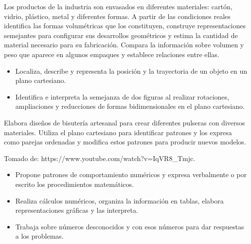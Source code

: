 \ejemplo

Los productos de la industria son envasados en diferentes materiales: cartón, vidrio, plástico, metal y diferentes formas. A partir de las condiciones reales identifica las formas volumétricas que los constituyen, construye representaciones semejantes para configurar sus desarrollos geométricos y estima la cantidad de material necesario para su fabricación. Compara la información sobre volumen y peso que aparece en algunos empaques y establece relaciones entre ellas.



\evidencias

\begin{itemize}
  \item Localiza, describe y representa la posición y la trayectoria de un objeto en un plano cartesiano.
  \item Identifica e interpreta la semejanza de dos figuras al realizar rotaciones, ampliaciones y reducciones de formas bidimensionales en el plano cartesiano.
\end{itemize}

\ejemplo

Elabora diseños de bisutería artesanal para crear diferentes pulseras con diversos materiales. Utiliza el plano cartesiano para identificar patrones y los expresa como parejas ordenadas y modifica estos patrones para producir nuevos modelos.


Tomado de: https://www.youtube.com/watch?v=IqVR8\_Tmjc.


\evidencias

\begin{itemize}
  \item Propone patrones de comportamiento numéricos y expresa verbalmente o por escrito los procedimientos matemáticos.
  \item Realiza cálculos numéricos, organiza la información en tablas, elabora representaciones gráficas y las interpreta.
  \item Trabaja sobre números desconocidos y con esos números para dar respuestas a los problemas.
\end{itemize}

